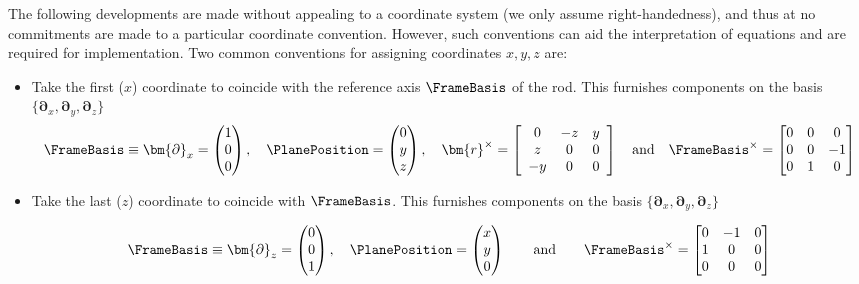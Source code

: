 \begin{remark}
The following developments are made without appealing to a coordinate system (we only assume right-handedness), and thus at no commitments are made to a particular coordinate convention. However, such conventions can aid the interpretation of equations and are required for implementation. 
Two common conventions for assigning coordinates \(x,y,z\) are:
\begin{itemize}
    \item Take the first (\(x\)) coordinate to coincide with the reference axis \(\FrameBasis\) of the rod. This furnishes components on the basis \(\{\bm{\partial}_x,\bm{\partial}_y,\bm{\partial}_z\}\)
    \begin{equation}
    \FrameBasis \equiv \bm{\partial}_x = \begin{pmatrix}
        1 \\ 0 \\ 0
    \end{pmatrix},
    \quad
    \PlanePosition = \begin{pmatrix}
    0 \\ y \\ z
    \end{pmatrix},
    \quad 
    \bm{r}^{\times} =\left[\begin{array}{ccc}
    0 & -z & y \\
    z & 0 &  0 \\
    -y & 0 & 0
    \end{array}\right]
    \quad\text{and}\quad 
    \FrameBasis^{\times} = \begin{bmatrix}
        0 & 0 & 0 \\
        0 & 0 & -1 \\
        0 & 1 & 0
    \end{bmatrix}
    \label{eq:define-basis-1}
    \end{equation}
    \item Take the last (\(z\)) coordinate to coincide with \(\FrameBasis\). This furnishes components on the basis \(\{\bm{\partial}_x,\bm{\partial}_y,\bm{\partial}_z\}\)
    
    \[
    \FrameBasis \equiv \bm{\partial}_z = \begin{pmatrix}
        0 \\ 0 \\ 1
    \end{pmatrix},
    \quad
    \PlanePosition = \begin{pmatrix}
    x \\ y \\ 0
    \end{pmatrix}
    \qquad\text{and}\qquad 
    \FrameBasis^{\times} = \begin{bmatrix}
        0 & -1 & 0 \\
        1 &  0 & 0 \\
        0 & 0 & 0
    \end{bmatrix}
    \]
\end{itemize}
\end{remark}

